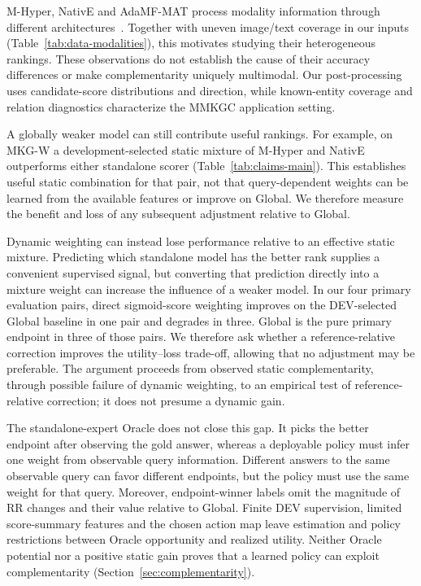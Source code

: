 \documentclass[11pt,a4paper]{article}
\begin{document}
M-Hyper, NativE and AdaMF-MAT process modality information through different architectures~\citep{mhyper,native,adamf}. Together with uneven image/text coverage in our inputs (Table~\ref{tab:data-modalities}), this motivates studying their heterogeneous rankings. These observations do not establish the cause of their accuracy differences or make complementarity uniquely multimodal. Our post-processing uses candidate-score distributions and direction, while known-entity coverage and relation diagnostics characterize the MMKGC application setting.

A globally weaker model can still contribute useful rankings. For example, on MKG-W a development-selected static mixture of M-Hyper and NativE outperforms either standalone scorer (Table~\ref{tab:claims-main}). This establishes useful static combination for that pair, not that query-dependent weights can be learned from the available features or improve on Global. We therefore measure the benefit and loss of any subsequent adjustment relative to Global.

Dynamic weighting can instead lose performance relative to an effective static mixture. Predicting which standalone model has the better rank supplies a convenient supervised signal, but converting that prediction directly into a mixture weight can increase the influence of a weaker model. In our four primary evaluation pairs, direct sigmoid-score weighting improves on the DEV-selected Global baseline in one pair and degrades in three. Global is the pure primary endpoint in three of those pairs. We therefore ask whether a reference-relative correction improves the utility--loss trade-off, allowing that no adjustment may be preferable. The argument proceeds from observed static complementarity, through possible failure of dynamic weighting, to an empirical test of reference-relative correction; it does not presume a dynamic gain.

The standalone-expert Oracle does not close this gap. It picks the better endpoint after observing the gold answer, whereas a deployable policy must infer one weight from observable query information. Different answers to the same observable query can favor different endpoints, but the policy must use the same weight for that query. Moreover, endpoint-winner labels omit the magnitude of RR changes and their value relative to Global. Finite DEV supervision, limited score-summary features and the chosen action map leave estimation and policy restrictions between Oracle opportunity and realized utility. Neither Oracle potential nor a positive static gain proves that a learned policy can exploit complementarity (Section~\ref{sec:complementarity}).
\end{document}

